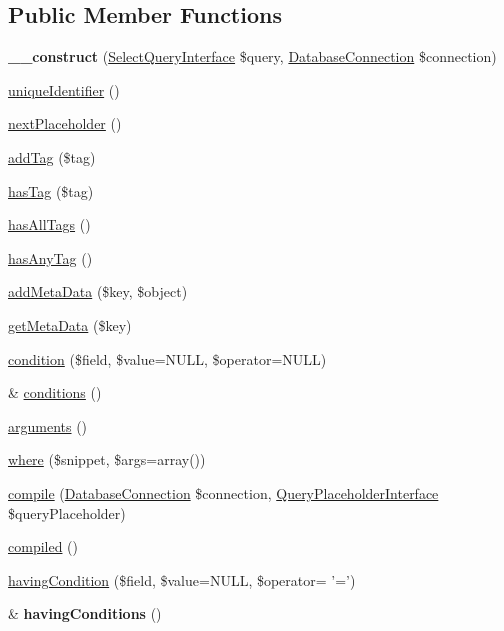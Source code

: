 \subsection*{Public Member Functions}
\begin{DoxyCompactItemize}
\item 
\hypertarget{classSelectQueryExtender_a0720075d5bc494a13e8c8561cb152ea9}{
{\bfseries \_\-\_\-construct} (\hyperlink{interfaceSelectQueryInterface}{SelectQueryInterface} \$query, \hyperlink{classDatabaseConnection}{DatabaseConnection} \$connection)}
\label{classSelectQueryExtender_a0720075d5bc494a13e8c8561cb152ea9}

\item 
\hyperlink{classSelectQueryExtender_a4bb30825327565c94e01b4f5a785a5ed}{uniqueIdentifier} ()
\item 
\hyperlink{classSelectQueryExtender_a202a005bca32569d69f1cc20acdb8ccb}{nextPlaceholder} ()
\item 
\hyperlink{classSelectQueryExtender_a3b2d7ff719982bd817dbe29d98c732db}{addTag} (\$tag)
\item 
\hyperlink{classSelectQueryExtender_ab9dd51674086089c405126e6508e232d}{hasTag} (\$tag)
\item 
\hyperlink{classSelectQueryExtender_a8dd095d197f27e0670fc2cc423ac99d6}{hasAllTags} ()
\item 
\hyperlink{classSelectQueryExtender_a6b6aec8ae5f5c3a98637db9d6e156008}{hasAnyTag} ()
\item 
\hyperlink{classSelectQueryExtender_a4ca41f7412e9f35bfd61c0c0e387c7f9}{addMetaData} (\$key, \$object)
\item 
\hyperlink{classSelectQueryExtender_a55a9736afef5f69e0e247d16d894b908}{getMetaData} (\$key)
\item 
\hyperlink{classSelectQueryExtender_a65446d6584a53f1c2be79dd1fd3bffdd}{condition} (\$field, \$value=NULL, \$operator=NULL)
\item 
\& \hyperlink{classSelectQueryExtender_a3d3779c339d6bb794e9c98dc361c07e4}{conditions} ()
\item 
\hyperlink{classSelectQueryExtender_a7095c455524c42ec48e49719ecc53d0c}{arguments} ()
\item 
\hyperlink{classSelectQueryExtender_a7ac93a5b39a4b816e95b9c2d588ba45a}{where} (\$snippet, \$args=array())
\item 
\hyperlink{classSelectQueryExtender_af0ccde59737751f63dfb1743798a45ab}{compile} (\hyperlink{classDatabaseConnection}{DatabaseConnection} \$connection, \hyperlink{interfaceQueryPlaceholderInterface}{QueryPlaceholderInterface} \$queryPlaceholder)
\item 
\hyperlink{classSelectQueryExtender_ae8449b348179f2717a6f07e14f3c806c}{compiled} ()
\item 
\hyperlink{classSelectQueryExtender_a33ac4aade6da091ee121cd442f32c5a2}{havingCondition} (\$field, \$value=NULL, \$operator= '=')
\item 
\hypertarget{classSelectQueryExtender_a5c9de4d9f5fe5992aac54cf441541f44}{
\& {\bfseries havingConditions} ()}
\label{classSelectQueryExtender_a5c9de4d9f5fe5992aac54cf441541f44}


\end{DoxyCompactItemize}
